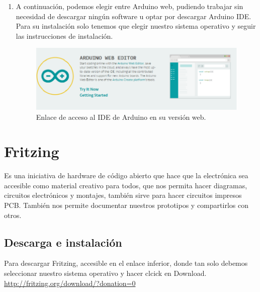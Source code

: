\begin{appendix}
\begin{enumerate}
\item A continuación, podemos elegir entre Arduino web, pudiendo trabajar sin necesidad de descargar ningún software u
optar por descargar Arduino IDE. Para su instalación solo tenemos que elegir nuestro sistema operativo y
seguir las instrucciones de instalación.

\begin{figure}[H]
  \begin{center}
    \includegraphics[scale=0.3]{imagenes/arduino_web_ide.png}
  \end{center}
  \label{fig:descarga_arduino}
 \caption{Enlace de acceso al IDE de Arduino en su versión web.}
 \end{figure}

\end{enumerate}

\section{Fritzing}

Es una iniciativa de hardware de código abierto que hace que la electrónica sea accesible como
material creativo para todos, que nos permita hacer diagramas, circuitos electrónicos y
montajes, también sirve para hacer circuitos impresos PCB. También nos permite documentar nuestros prototipos y compartirlos con otros.

\subsection{Descarga e instalación}

Para descargar Fritzing, accesible en el enlace inferior, donde tan solo debemos seleccionar nuestro sistema operativo y hacer clcick en Download. \\

\url{http://fritzing.org/download/?donation=0}


\end{appendix}

